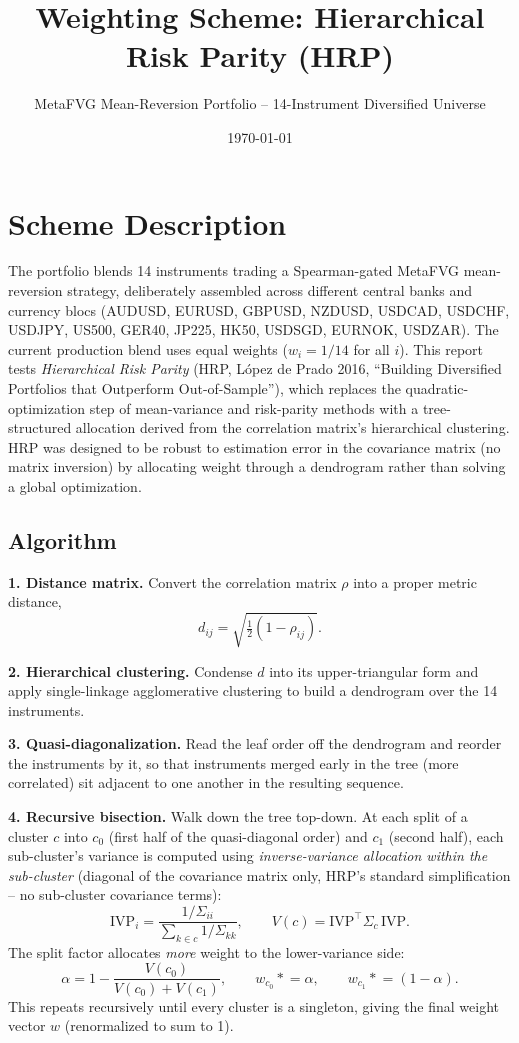 \documentclass[11pt]{article}
\title{Weighting Scheme: Hierarchical Risk Parity (HRP)}
\author{MetaFVG Mean-Reversion Portfolio -- 14-Instrument Diversified Universe}
\date{\today}
\begin{document}
\maketitle

\section{Scheme Description}

The portfolio blends 14 instruments trading a Spearman-gated MetaFVG mean-reversion
strategy, deliberately assembled across different central banks and currency blocs
(AUDUSD, EURUSD, GBPUSD, NZDUSD, USDCAD, USDCHF, USDJPY, US500, GER40, JP225, HK50,
USDSGD, EURNOK, USDZAR). The current production blend uses equal weights
($w_i = 1/14$ for all $i$). This report tests \emph{Hierarchical Risk Parity} (HRP,
L\'{o}pez de Prado 2016, ``Building Diversified Portfolios that Outperform
Out-of-Sample''), which replaces the quadratic-optimization step of mean-variance and
risk-parity methods with a tree-structured allocation derived from the correlation
matrix's hierarchical clustering. HRP was designed to be robust to estimation error
in the covariance matrix (no matrix inversion) by allocating weight through a
dendrogram rather than solving a global optimization.

\subsection{Algorithm}

\textbf{1. Distance matrix.} Convert the correlation matrix $\rho$ into a proper
metric distance,
\[
  d_{ij} = \sqrt{\tfrac{1}{2}\left(1 - \rho_{ij}\right)}.
\]

\textbf{2. Hierarchical clustering.} Condense $d$ into its upper-triangular form and
apply single-linkage agglomerative clustering to build a dendrogram over the 14
instruments.

\textbf{3. Quasi-diagonalization.} Read the leaf order off the dendrogram and reorder
the instruments by it, so that instruments merged early in the tree (more correlated)
sit adjacent to one another in the resulting sequence.

\textbf{4. Recursive bisection.} Walk down the tree top-down. At each split of a
cluster $c$ into $c_0$ (first half of the quasi-diagonal order) and $c_1$ (second
half), each sub-cluster's variance is computed using \emph{inverse-variance
allocation within the sub-cluster} (diagonal of the covariance matrix only, HRP's
standard simplification -- no sub-cluster covariance terms):
\[
  \mathrm{IVP}_i = \frac{1/\Sigma_{ii}}{\sum_{k \in c} 1/\Sigma_{kk}}, \qquad
  V(c) = \mathrm{IVP}^\top \Sigma_c\, \mathrm{IVP}.
\]
The split factor allocates \emph{more} weight to the lower-variance side:
\[
  \alpha = 1 - \frac{V(c_0)}{V(c_0) + V(c_1)}, \qquad
  w_{c_0} \mathrel{*}= \alpha, \qquad w_{c_1} \mathrel{*}= (1-\alpha).
\]
This repeats recursively until every cluster is a singleton, giving the final weight
vector $w$ (renormalized to sum to 1).
\end{document}
